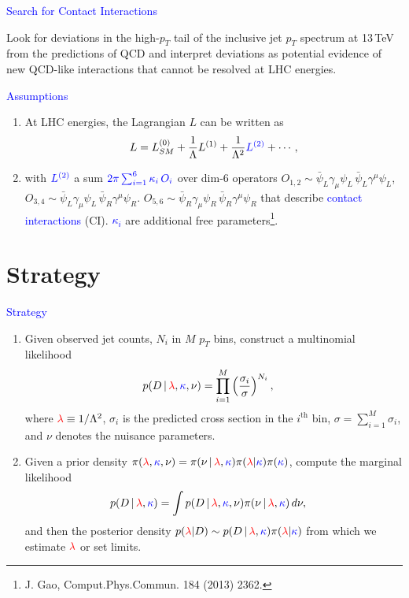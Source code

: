 \documentclass[t,professionalfonts,handout, xcolor=pdftex,dvipsnames,table]{beamer}
\newcommand{\rlambda}{\textcolor{red}{\lambda}}
\newcommand{\bkappa}{\textcolor{blue}{\kappa}}
\begin{document}
\begin{frame}
\textcolor{blue}{Search for Contact Interactions}
\smallskip

Look for deviations in the high-$p_T$ tail of the inclusive jet $p_T$ spectrum 
at 13\,TeV from the predictions of QCD and
interpret deviations as potential evidence of new QCD-like interactions that cannot be resolved
at LHC energies.
\smallskip

\textcolor{blue}{Assumptions}
\begin{enumerate}
\item At LHC energies, the Lagrangian $L$ can be written as
$$L = L^{(0)}_{SM} + \frac{1}{\Lambda} L^{(1)} + \frac{1}{\Lambda^2} \textcolor{blue}{L^{(2)}} + \cdots,$$

\item with $\textcolor{blue}{L^{(2)}}$ a sum
$\textcolor{blue}{2\pi  \sum_{i=1}^6 \kappa_i \, O_i}$ over dim-6 operators $O_{1,2} \sim \bar{\psi}_L \gamma_\mu \psi_L\,\bar{\psi}_L \gamma^\mu \psi_L$,  $O_{3,4} \sim \bar{\psi}_L \gamma_\mu \psi_L\,\bar{\psi}_R \gamma^\mu \psi_R$.
$O_{5,6} \sim \bar{\psi}_R \gamma_\mu \psi_R\,\bar{\psi}_R \gamma^\mu \psi_R$ that 
describe \textcolor{blue}{contact interactions} (CI).  \textcolor{blue}{$\kappa_i$} are additional free parameters\footnote{J. Gao, Comput.Phys.Commun. 184 (2013) 2362.}.
\end{enumerate}
\end{frame}


\section{Strategy}
\begin{frame}
\textcolor{blue}{Strategy}  
\begin{enumerate}
\item
Given observed jet counts, $N_i$ in $M$ $p_T$ bins, construct a multinomial likelihood 
\begin{align*}
p(D \, |\, \rlambda, \bkappa, \nu) & = \prod_{i=1}^M \left( \frac{\sigma_i}{\sigma} \right )^{N_i},
\end{align*}
where $\rlambda \equiv 1/\Lambda^2$,  $\sigma_i$
is the predicted cross section in the $i^\text{th}$ bin, $\sigma = \sum_{i=1}^M \sigma_i$, and $\nu$ denotes the nuisance parameters. 
\item
Given a prior density $\pi(\rlambda, \bkappa, \nu) = \pi(\nu  \, | \,  \rlambda, \bkappa)  \pi(\rlambda | \bkappa) \pi(\bkappa)$, 
compute the marginal likelihood
\begin{align*}
p(D \, |\, \rlambda, \bkappa) & = \int p(D \, |\, \rlambda, \bkappa, \nu  )  \pi(\nu  \, | \,  \rlambda, \bkappa)  \, d\nu , \nonumber
\end{align*}
and then the posterior density $p(\rlambda |  D) \sim  p(D \, |\, \rlambda, \bkappa)  \pi(\rlambda | \bkappa)$
from which we estimate $\rlambda$ or set limits.
\end{enumerate}

\end{frame}
\end{document}
